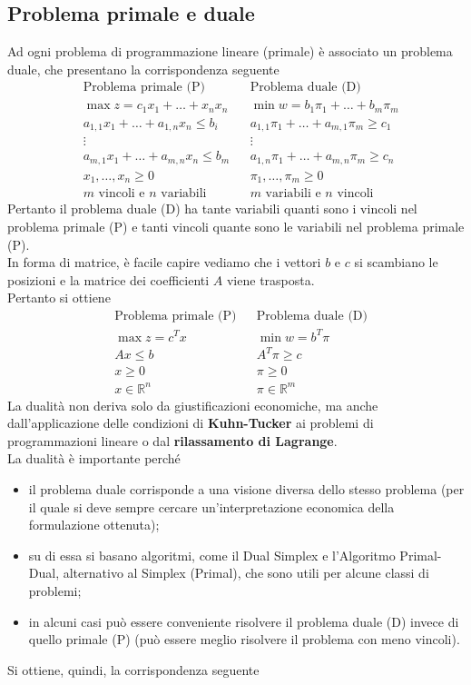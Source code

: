 \documentclass[a4paper]{extarticle}
\begin{document}
\subsection{Problema primale e duale}
Ad ogni problema di programmazione lineare (primale) è associato un problema duale, che presentano la corrispondenza seguente
\begin{align*}
    &\text{Problema primale (P)} && \text{Problema duale (D)}\\
    &\max z=c_1x_1+\dots+x_nx_n   && \min w=b_1\pi_1+\dots+b_m\pi_m\\
    &a_{1,1}x_1 + \dots + a_{1,n}x_n \leq b_i && a_{1,1}\pi_1+\dots+a_{m,1} \pi_m \geq c_1\\
    &\vdots && \vdots\\
    &a_{m,1}x_1 + \dots + a_{m,n}x_n \leq b_m && a_{1,n}\pi_1+\dots+a_{m,n} \pi_m \geq c_n\\
    &x_1,\dots,x_n \geq 0 && \pi_1,\dots,\pi_m \geq 0\\
    &m\text{ vincoli e } n \text{ variabili} && m \text{ variabili e } n \text{ vincoli}
\end{align*}
Pertanto il problema duale (D) ha tante variabili quanti sono i vincoli nel problema primale (P) e tanti vincoli quante sono le variabili nel problema primale (P).\\
In forma di matrice, è facile capire vediamo che i vettori $b$ e $c$ si scambiano le posizioni e la matrice dei coefficienti $A$ viene trasposta.\\
Pertanto si ottiene
\begin{align*}
    &\text{Problema primale (P)} && \text{Problema duale (D)}\\
    &\max z=c^Tx   && \min w=b^T\pi\\
    &Ax \leq b && A^T\pi \geq c\\
    &x \geq 0 && \pi \geq 0\\
    &x \in \mathbb{R}^n && \pi \in \mathbb{R}^m
\end{align*}
La dualità non deriva solo da giustificazioni economiche, ma anche dall'applicazione delle condizioni di \textbf{Kuhn-Tucker} ai problemi di programmazioni lineare o dal \textbf{rilassamento di Lagrange}.\\
La dualità è importante perché
\begin{itemize}
    \item il problema duale corrisponde a una visione diversa dello stesso problema (per il quale si deve sempre cercare un'interpretazione economica della formulazione ottenuta);
    \item su di essa si basano algoritmi, come il Dual Simplex e l'Algoritmo Primal-Dual, alternativo al Simplex (Primal), che sono utili per alcune classi di problemi;
    \item in alcuni casi può essere conveniente risolvere il problema duale (D) invece di quello primale (P) (può essere meglio risolvere il problema con meno vincoli).
\end{itemize}
Si ottiene, quindi, la corrispondenza seguente
\end{document}
